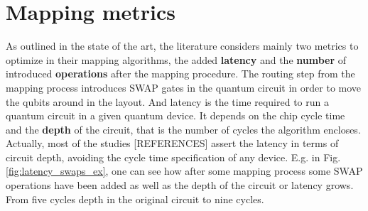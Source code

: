 \section*{Mapping metrics}
\label{sec:org9ed23de}

As outlined in the state of the art, the literature considers mainly two metrics to optimize in their mapping algorithms, the added \textbf{latency} and the \textbf{number} of introduced \textbf{operations} after the mapping procedure.
The routing step from the mapping process introduces SWAP gates in the quantum circuit in order to move the qubits around in the layout.
And latency is the time required to run a quantum circuit in a given quantum device.
It depends on the chip cycle time and the \textbf{depth} of the circuit, that is the number of cycles the algorithm encloses.
Actually, most of the studies [REFERENCES] assert the latency in terms of circuit depth, avoiding the cycle time specification of any device.
E.g. in Fig. \ref{fig:latency_swaps_ex}, one can see how after some mapping process some SWAP operations have been added as well as the depth of the circuit or latency grows.
From five cycles depth in the original circuit to nine cycles.


